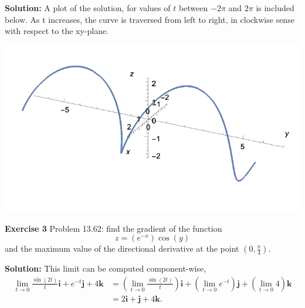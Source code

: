 \documentclass[12pt,oneside]{exam}
\newenvironment{exercise}[1]{\vspace{.1in}\noindent\textbf{Exercise #1 \hspace{.05em}}}{}
\newenvironment{newsolution}{\vspace{.1in}\noindent\textbf{Solution: \hspace{.05em}}}{}
\begin{document}
\begin{newsolution}
A plot of the solution, for values of $t$ between $-2\pi$ and $2\pi$ is included below. As t increases, the curve is traversed from left to right, in clockwise sense with respect to the xy-plane. 
\begin{center}
\includegraphics[scale=0.8]{p2.pdf}
\end{center}
\end{newsolution}


\begin{exercise}{3}
Problem 13.62: find the gradient of the function
\begin{equation*}
z = (e^{-x})\cos(y)
\end{equation*}
and the maximum value of the directional derivative at the point $\left(0,\frac{\pi}{4}\right).$
\end{exercise}

\begin{newsolution}
This limit can be computed component-wise, 
\begin{align*}
\lim_{t \to 0} \frac{\sin(2t)}{t}\mathbf{i} + e^{-t}\mathbf{j} + 4\mathbf{k} & =  \left( \lim_{t \to 0} \frac{\sin(2t)}{t}\right) \mathbf{i} + \left( \lim_{t \to 0} e^{-t}\right) \mathbf{j} + \left( \lim_{t \to 0} 4\right) \mathbf{k} \\
& = 2\mathbf{i} + \mathbf{j} + 4\mathbf{k}.
\end{align*}
\end{newsolution} 
\end{document}
